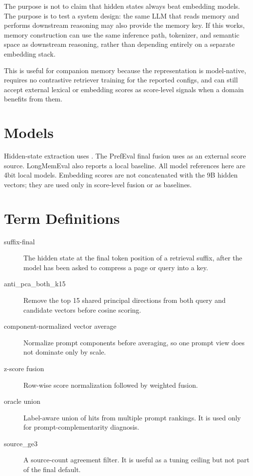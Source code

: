 \documentclass[11pt]{article}
\begin{document}
The purpose is not to claim that hidden states always beat embedding models.
The purpose is to test a system design: the same LLM that reads memory and
performs downstream reasoning may also provide the memory key. If this works,
memory construction can use the same inference path, tokenizer, and semantic
space as downstream reasoning, rather than depending entirely on a separate
embedding stack.

This is useful for companion memory because the representation is model-native,
requires no contrastive retriever training for the reported configs, and can
still accept external lexical or embedding scores as score-level signals when a
domain benefits from them.

\section{Models}

Hidden-state extraction uses . The PrefEval
final fusion uses  as an external
score source. LongMemEval also reports a local
 baseline. All model references here are
4bit local models. Embedding scores are not concatenated with the 9B hidden
vectors; they are used only in score-level fusion or as baselines.

\section{Term Definitions}

\begin{description}
  \item[suffix-final] The hidden state at the final token position of a
  retrieval suffix, after the model has been asked to compress a page or query
  into a key.
  \item[anti\_pca\_both\_k15] Remove the top 15 shared principal directions
  from both query and candidate vectors before cosine scoring.
  \item[component-normalized vector average] Normalize prompt components before
  averaging, so one prompt view does not dominate only by scale.
  \item[z-score fusion] Row-wise score normalization followed by weighted
  fusion.
  \item[oracle union] Label-aware union of hits from multiple prompt rankings.
  It is used only for prompt-complementarity diagnosis.
  \item[source\_ge3] A source-count agreement filter. It is useful as a tuning
  ceiling but not part of the final default.
\end{description}
\end{document}
